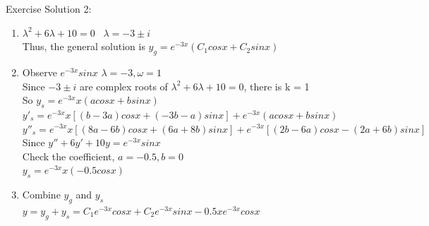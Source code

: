 \documentclass{beamer}
\begin{document}
\begin{frame}{Exercise}
Solution 2:
\begin{enumerate}
    \item $\lambda^2 + 6\lambda + 10 = 0$ \ $\lambda = -3 \pm i$ \\Thus, the general solution is $y_g = e^{-3x}(C_1cosx + C_2 sinx)$
    \item Observe $e^{-3x}sinx$ \rightarrow $\lambda = -3, \omega = 1$ \\ Since $-3\pm i$ are complex roots of $\lambda^2 + 6 \lambda + 10 = 0$, there is k = 1 \\So $y_s = e^{-3x}x(acosx + bsinx)$\\ $y'_s = e^{-3x}x[(b-3a)cosx + (-3b-a)sinx] +e^{-3x}(acosx + bsinx)$\\
    $y''_s = e^{-3x}x[(8a - 6b)cosx + (6a + 8b)sinx] + e^{-3x}[(2b-6a)cosx - (2a + 6b)sinx]$\\
    Since $y''+6y'+ 10y = e^{-3x}sinx$\\ Check the coefficient, $a = -0.5, b = 0$\\ $y_s = e^{-3x}x (-0.5cosx)$
    \item Combine $y_g$ and $y_s$\\
    $y = y_g + y_s = C_1 e^{-3x}cosx + C_2 e^{-3x}sinx - 0.5 xe^{-3x}cosx$

\end{enumerate}
\end{frame}
\thankframe
\end{document}
